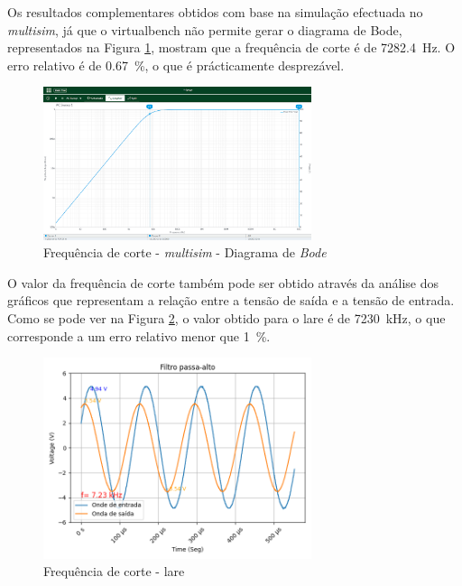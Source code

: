 Os resultados complementares obtidos com base na simulação efectuada no \textit{multisim}, já que o \acrshort{virtualbench} não permite gerar o diagrama de Bode, representados na Figura \ref{fig:fcBodemultisim}, mostram que a frequência de corte é de \SI{7282.4}{\hertz}. O erro relativo é de \SI{0.67}{\percent}, o que é prácticamente desprezável.

\begin{figure}[hbtp]
	\centering
	\includegraphics[width=0.7\textwidth]{figures/boda_HPF_fc.png}
	\caption{Frequência de corte - \textit{multisim} - Diagrama de \textit{Bode}}
	\label{fig:fcBodemultisim}
\end{figure}

O valor da frequência de corte também pode ser obtido através da análise dos gráficos que representam a relação entre a tensão de saída e a tensão de entrada. Como se pode ver na Figura \ref{fig:fcvoutlare}, o valor obtido para o \acrshort{lare} é de \SI{7230}{\kilo\hertz}, o que corresponde a um erro relativo menor que \SI{1}{\percent}.

\begin{figure}[hbtp]
	\centering
	\includegraphics[width=0.7\textwidth]{figures/filtro_passa-alto_fc_LaRE.png}
	\caption{Frequência de corte - \acrshort{lare}}
	\label{fig:fcvoutlare}
\end{figure}

